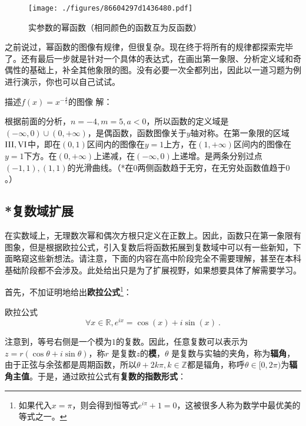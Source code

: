 \begin{figure}[ht]
\centering
\texttt{[image: ./figures/86604297d1436480.pdf]}
\caption{实参数的幂函数（相同颜色的函数互为反函数）}\label{fig_power_1}
\end{figure}

之前说过，幂函数的图像有规律，但很复杂。现在终于将所有的规律都探索完毕了。还有最后一步就是针对一个具体的表达式，在画出第一象限、分析定义域和奇偶性的基础上，补全其他象限的图。没有必要一次全都列出，因此以一道习题为例进行演示，你也可以自己试试。

\begin{exercise}{描述$f(x)=x^{-\frac{4}{5}}$的图像}
解：

根据前面的分析，$n=-4,m=5,a<0$，所以函数的定义域是$({-\infty},0)\cup(0,{+\infty})$，是偶函数，函数图像关于$y$轴对称。在第一象限的区域$\rm{III,VI}$中，即在$(0,1)$区间内的图像在$y=1$上方，在$(1,+\infty)$区间内的图像在$y=1$下方。在$(0,{+\infty})$上递减，在$({-\infty},0)$上递增。是两条分别过点$(-1,1),(1,1)$的光滑曲线。（*在$0$两侧函数趋于无穷，在无穷处函数值趋于$0$。）
\end{exercise}

\subsection{*复数域扩展}


在实数域上，无理数次幂和偶次方根只定义在正数上。因此，函数只在第一象限有图象，但是根据欧拉公式，引入复数后将函数拓展到复数域中可以有一些新知，下面略窥这些新想法。请注意，下面的内容在高中阶段完全不需要理解，甚至在本科基础阶段都不会涉及。此处给出只是为了扩展视野，如果想要具体了解需要学习。

首先，不加证明地给出\textbf{欧拉公式}\footnote{如果代入$x=\pi$，则会得到恒等式$e^{i\pi}+1=0$，这被很多人称为数学中最优美的等式之一。}：

\begin{theorem}{欧拉公式}
\begin{equation}
\forall x\in\mathbb{R},e^{ix} = \cos(x) + i\sin(x)~.
\end{equation}
\end{theorem}

注意到，等号右侧是一个模为$1$的复数。因此，任意复数可以表示为 $z = r (\cos \theta + i \sin \theta)$，称$r$ 是复数$z$的\textbf{模}，$\theta$ 是复数与实轴的夹角，称为\textbf{辐角}，由于正弦与余弦都是周期函数，所以$\theta+2k\pi,k\in\mathbb{Z}$都是辐角，称呼$\theta\in[0,2\pi)$为\textbf{辐角主值}。于是，通过欧拉公式有\textbf{复数的指数形式}：

